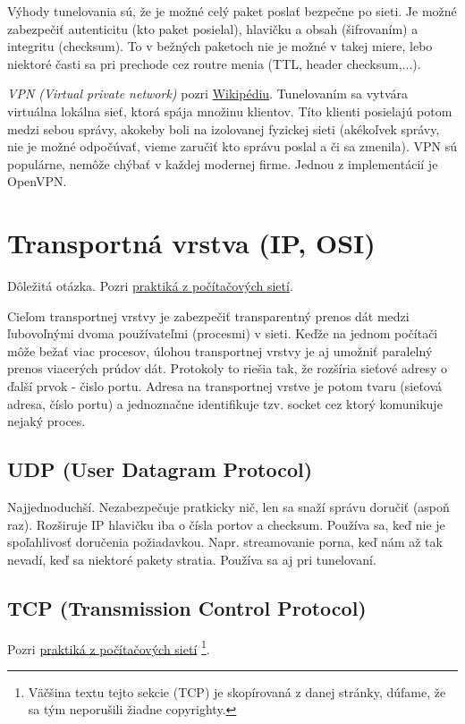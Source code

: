 \documentclass[10pt,a4paper]{article}
\begin{document}
Výhody tunelovania sú, že je možné celý paket poslať bezpečne po sieti. Je možné zabezpečiť autenticitu (kto paket posielal), hlavičku a obsah (šifrovaním) a integritu (checksum). 
To v bežných paketoch nie je možné v takej miere, lebo niektoré časti sa pri prechode cez routre menia (TTL, header checksum,...).  

\emph{VPN (Virtual private network)} pozri \href{http://en.wikipedia.org/wiki/Virtual_private_network}{Wikipédiu}.
Tunelovaním sa vytvára virtuálna lokálna sieť, ktorá spája množinu klientov. Títo klienti posielajú potom medzi sebou správy, akokeby boli na izolovanej fyzickej sieti (akékoľvek správy, nie je možné odpočúvať, vieme zaručiť kto správu poslal a či sa zmenila). 
VPN sú populárne, nemôže chýbať v každej modernej firme. 
Jednou z implementácií je OpenVPN. 
                                                           
\section{Transportná vrstva (IP, OSI)}       
Dôležitá otázka. Pozri \href{http://netlab.dcs.fmph.uniba.sk/siete/cviko4/}{praktiká z počítačových sietí}. 
   
Cieľom transportnej vrstvy je zabezpečiť transparentný prenos dát medzi ľubovoľnými dvoma používateľmi (procesmi) v sieti. Keďže na jednom počítači môže bežať viac procesov, úlohou transportnej vrstvy je aj umožniť paralelný prenos viacerých prúdov dát. Protokoly to riešia tak, že rozšíria sieťové adresy o ďalší prvok - čislo portu. Adresa na transportnej vrstve je potom tvaru (sieťová adresa, číslo portu) a jednoznačne identifikuje tzv. socket cez ktorý komunikuje nejaký proces.
   
\subsection{UDP (User Datagram Protocol)}   
Najjednoduchší. Nezabezpečuje pratkicky nič, len sa snaží správu doručiť (aspoň raz). 
Rozširuje IP hlavičku iba o čísla portov a checksum. 
Používa sa, keď nie je spoľahlivosť doručenia požiadavkou. Napr. streamovanie porna, keď nám až tak nevadí, keď sa niektoré pakety stratia. 
Používa sa aj pri tunelovaní. 

\subsection{TCP (Transmission Control Protocol)}   
Pozri \href{http://netlab.dcs.fmph.uniba.sk/siete/cviko5/}{praktiká z počítačových sietí} \footnote{Väčšina textu tejto sekcie (TCP) je skopírovaná z danej stránky, dúfame, že sa tým neporušili žiadne copyrighty.}.
\end{document}
